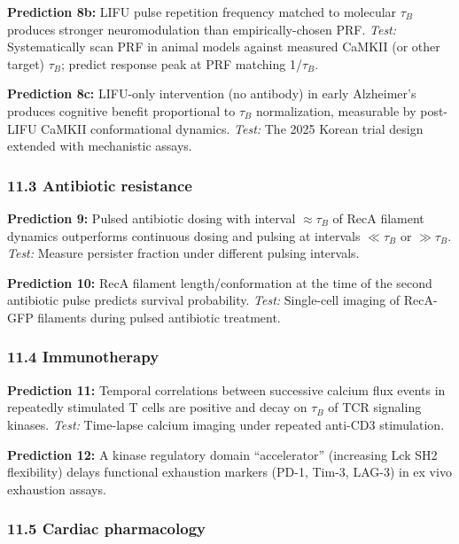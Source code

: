 \documentclass[
]{article}
\begin{document}
\textbf{Prediction 8b:} LIFU pulse repetition frequency matched to
molecular \(\tau_B\) produces stronger neuromodulation than
empirically-chosen PRF. \emph{Test:} Systematically scan PRF in animal
models against measured CaMKII (or other target) \(\tau_B\); predict
response peak at PRF matching 1/\(\tau_B\).

\textbf{Prediction 8c:} LIFU-only intervention (no antibody) in early
Alzheimer's produces cognitive benefit proportional to \(\tau_B\)
normalization, measurable by post-LIFU CaMKII conformational dynamics.
\emph{Test:} The 2025 Korean trial design extended with mechanistic
assays.

\hypertarget{antibiotic-resistance-1}{%
\subsubsection{11.3 Antibiotic
resistance}\label{antibiotic-resistance-1}}

\textbf{Prediction 9:} Pulsed antibiotic dosing with interval
\(\approx \tau_B\) of RecA filament dynamics outperforms continuous
dosing and pulsing at intervals \(\ll \tau_B\) or \(\gg \tau_B\).
\emph{Test:} Measure persister fraction under different pulsing
intervals.

\textbf{Prediction 10:} RecA filament length/conformation at the time of
the second antibiotic pulse predicts survival probability. \emph{Test:}
Single-cell imaging of RecA-GFP filaments during pulsed antibiotic
treatment.

\hypertarget{immunotherapy}{%
\subsubsection{11.4 Immunotherapy}\label{immunotherapy}}

\textbf{Prediction 11:} Temporal correlations between successive calcium
flux events in repeatedly stimulated T cells are positive and decay on
\(\tau_B\) of TCR signaling kinases. \emph{Test:} Time-lapse calcium
imaging under repeated anti-CD3 stimulation.

\textbf{Prediction 12:} A kinase regulatory domain ``accelerator''
(increasing Lck SH2 flexibility) delays functional exhaustion markers
(PD-1, Tim-3, LAG-3) in ex vivo exhaustion assays.

\hypertarget{cardiac-pharmacology-1}{%
\subsubsection{11.5 Cardiac pharmacology}\label{cardiac-pharmacology-1}}
\end{document}

